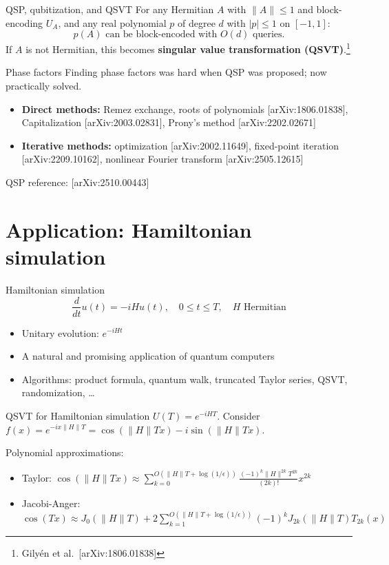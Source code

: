 \documentclass[aspectratio=169]{beamer}
\begin{document}
\begin{frame}{QSP, qubitization, and QSVT}
For any Hermitian $A$ with $\|A\|\le1$ and block-encoding $U_A$, and any real polynomial $p$ of degree $d$ with $|p|\le1$ on $[-1,1]$:
$$p(A)\text{ can be block-encoded with }O(d)\text{ queries.}$$
If $A$ is not Hermitian, this becomes \textbf{singular value transformation (QSVT)}.\footnote{Gily\'{e}n et al.\ [arXiv:1806.01838]}
\end{frame}

\begin{frame}{Phase factors}
Finding phase factors was hard when QSP was proposed; now practically solved.
\begin{itemize}
\item \textbf{Direct methods:} Remez exchange, roots of polynomials [arXiv:1806.01838], Capitalization [arXiv:2003.02831], Prony's method [arXiv:2202.02671]
\item \textbf{Iterative methods:} optimization [arXiv:2002.11649], fixed-point iteration [arXiv:2209.10162], nonlinear Fourier transform [arXiv:2505.12615]
\end{itemize}
QSP reference: [arXiv:2510.00443]
\end{frame}

\section{Application: Hamiltonian simulation}
\begin{frame}\sectionpage\end{frame}

\begin{frame}{Hamiltonian simulation}
$$\frac{d}{dt}u(t)=-iHu(t),\quad 0\le t\le T,\quad H\text{ Hermitian}$$
\begin{itemize}
\item Unitary evolution: $e^{-iHt}$
\item A natural and promising application of quantum computers
\item Algorithms: product formula, quantum walk, truncated Taylor series, QSVT, randomization, \ldots
\end{itemize}
\end{frame}

\begin{frame}{QSVT for Hamiltonian simulation}
$U(T)=e^{-iHT}$. Consider $f(x)=e^{-ix\|H\|T}=\cos(\|H\|Tx)-i\sin(\|H\|Tx)$.

Polynomial approximations:
\begin{itemize}
\item Taylor: $\cos(\|H\|Tx)\approx\sum_{k=0}^{O(\|H\|T+\log(1/\epsilon))}\frac{(-1)^k\|H\|^{2k}T^{2k}}{(2k)!}x^{2k}$
\item Jacobi-Anger: $\cos(Tx)\approx J_0(\|H\|T)+2\sum_{k=1}^{O(\|H\|T+\log(1/\epsilon))}(-1)^kJ_{2k}(\|H\|T)T_{2k}(x)$
\end{itemize}
\end{frame}
\end{document}
